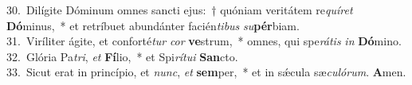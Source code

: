 {30.~}Dilígite Dóminum omnes sancti ejus:~† quóniam veritátem re\textit{quí}\textit{ret} \textbf{Dó}minus,~* et retríbuet abundánter facién\textit{ti}\textit{bus} \textit{su}\textbf{pér}biam.\\
{31.~}Viríliter ágite, et conforté\textit{tur} \textit{cor} \textbf{ve}strum,~* omnes, qui spe\textit{rá}\textit{tis} \textit{in} \textbf{Dó}mino.\\
{32.~}Glória Pa\textit{tri}, \textit{et} \textbf{Fí}lio,~* et Spi\textit{rí}\textit{tu}\textit{i} \textbf{San}cto.\\
{33.~}Sicut erat in princípio, et \textit{nunc}, \textit{et} \textbf{sem}per,~* et in sǽcula sæ\textit{cu}\textit{ló}\textit{rum}. \textbf{A}men.\\

